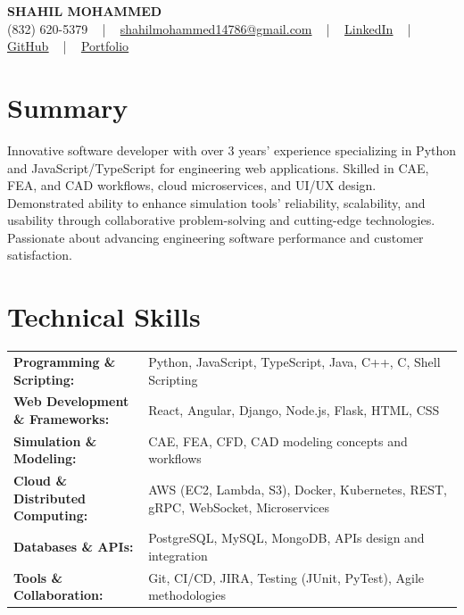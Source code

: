 \documentclass[letterpaper,11pt]{article}
\begin{document}
\begin{center}
    {\fontsize{14pt}{12pt}\selectfont \textbf{\MakeUppercase{Shahil Mohammed}}}\\ \vspace{2pt}
    \fontsize{10pt}{12pt}\selectfont (832) 620-5379 ~ | ~ \href{mailto:shahilmohammed14786@gmail.com}{shahilmohammed14786@gmail.com} ~ | ~  
    \href{https://www.linkedin.com/in/shahil-mohammed-9652931a1/}{\color{blue}\underline{LinkedIn}}  ~ | ~ 
    \href{https://github.com/freakbeast14}{\color{blue}\underline{GitHub}} ~ | ~ 
    \href{https://shahil-mohammed.netlify.app/}{\color{blue}\underline{Portfolio}}
    \vspace{-8pt}
\end{center}

\section{Summary}
\fontsize{9pt}{10pt}\selectfont
Innovative software developer with over 3 years’ experience specializing in Python and JavaScript/TypeScript for engineering web applications. Skilled in CAE, FEA, and CAD workflows, cloud microservices, and UI/UX design. Demonstrated ability to enhance simulation tools’ reliability, scalability, and usability through collaborative problem-solving and cutting-edge technologies. Passionate about advancing engineering software performance and customer satisfaction.
 \vspace{-5pt}
 
\section{Technical Skills}
        \vspace{-14pt}
        \begin{table}[h]
            \fontsize{9pt}{10pt}\selectfont
            \begin{tabular}{p{0.3\linewidth} p{0.7\linewidth}}
                \textbf{Programming \& Scripting:} & Python, JavaScript, TypeScript, Java, C++, C, Shell Scripting \\
                \textbf{Web Development \& Frameworks:} & React, Angular, Django, Node.js, Flask, HTML, CSS \\
                \textbf{Simulation \& Modeling:} & CAE, FEA, CFD, CAD modeling concepts and workflows \\
                \textbf{Cloud \& Distributed Computing:} & AWS (EC2, Lambda, S3), Docker, Kubernetes, REST, gRPC, WebSocket, Microservices \\
                \textbf{Databases \& APIs:} & PostgreSQL, MySQL, MongoDB, APIs design and integration \\
                \textbf{Tools \& Collaboration:} & Git, CI/CD, JIRA, Testing (JUnit, PyTest), Agile methodologies \\
            \end{tabular}
        \end{table}
 \vspace{-15pt}
 
\end{document}
